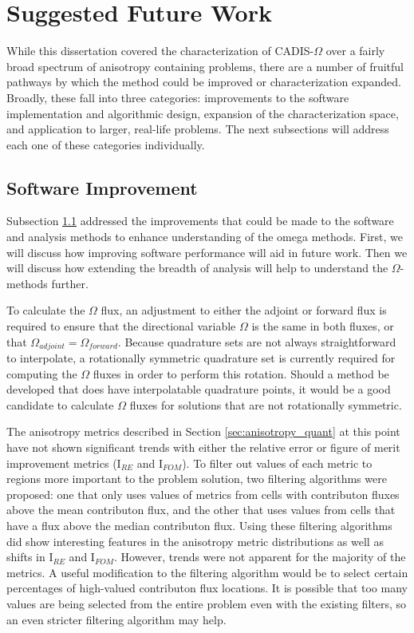 \section{Suggested Future Work}
\label{sec:futurewrk}

While this dissertation covered the characterization of CADIS-$\Omega$ over a
fairly broad spectrum of anisotropy containing problems, there are a number of
fruitful pathways by which the method could be improved or characterization
expanded. Broadly, these fall into three categories: improvements to the
software implementation and algorithmic design, expansion of the
characterization space, and application to larger, real-life problems. The next
subsections will address each one of these categories individually.

\subsection{Software Improvement}
\label{subsec:softwareimp}

Subsection \ref{subsec:softwareimp} addressed the improvements that could be
made to the software and analysis methods to enhance understanding of the omega
methods. First, we will discuss how improving software performance will aid in
future work. Then we will discuss how extending the breadth of analysis will
help to understand the $\Omega$-methods further.

To calculate the $\Omega$ flux, an adjustment to either the adjoint or forward
flux is
required to ensure that the directional variable $\Omega$ is the same in both
fluxes, or that $\Omega_{adjoint} = \Omega_{forward}$. Because quadrature sets
are not always straightforward to interpolate, a rotationally symmetric
quadrature set is currently required for computing the $\Omega$ fluxes in order
to perform this rotation.
Should a method
be developed that does have interpolatable quadrature points, it would be a good
candidate to calculate $\Omega$ fluxes for solutions that are not
rotationally symmetric.

The anisotropy metrics described in Section \ref{sec:anisotropy_quant} at this
point have not shown significant trends with either the relative error or figure
of merit improvement metrics (I$_{RE}$ and I$_{FOM}$). To filter out values of
each metric to regions more important to the problem solution, two filtering
algorithms were proposed: one that only uses values of metrics from cells with
contributon fluxes above the mean contributon flux, and the other that uses
values from cells that have a flux above the median contributon flux. Using
these filtering algorithms did show interesting features in the anisotropy
metric distributions as well as shifts in I$_{RE}$ and I$_{FOM}$. However,
trends were not apparent for the majority of the metrics. A useful modification
to the filtering algorithm would be to select certain percentages of high-valued
contributon flux locations. It is possible that too many values are being
selected from the entire problem even with the existing filters, so an even
stricter filtering algorithm may help.

